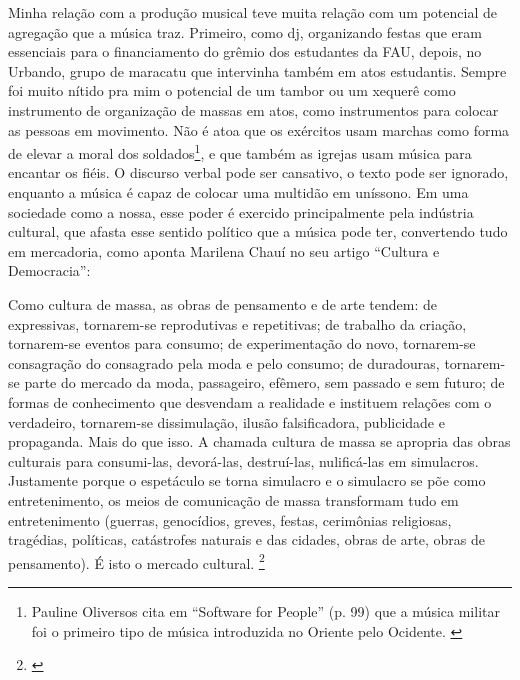 Minha relação com a produção musical teve muita relação com um potencial de agregação que a música traz. Primeiro, como dj, organizando festas que eram essenciais para o financiamento do grêmio dos estudantes da FAU, depois, no Urbando, grupo de maracatu que intervinha também em atos estudantis. Sempre foi muito nítido pra mim o potencial de um tambor ou um xequerê como instrumento de organização de massas em atos, como instrumentos para colocar as pessoas em movimento. Não é atoa que os exércitos usam marchas como forma de elevar a moral dos soldados\footnote{Pauline Oliversos cita em ``Software for People'' (p. 99) que a música militar foi o primeiro tipo de música introduzida no Oriente pelo Ocidente. \cite{Oliveros2012}}, e que também as igrejas usam música para encantar os fiéis. O discurso verbal pode ser cansativo, o texto pode ser ignorado, enquanto a música é capaz de colocar uma multidão em uníssono. Em uma sociedade como a nossa, esse poder é exercido principalmente pela indústria cultural, que afasta esse sentido político que a música pode ter, convertendo tudo em mercadoria, como aponta Marilena Chauí no seu artigo ``Cultura e Democracia'': 

\begin{citacao}

Como cultura de massa, as obras de pensamento e de arte tendem: de expressivas, tornarem-se reprodutivas e repetitivas; de trabalho da criação, tornarem-se eventos para consumo; de experimentação do novo, tornarem-se consagração do consagrado pela moda e pelo consumo; de duradouras, tornarem-se parte do mercado da moda, passageiro, efêmero, sem passado e sem futuro; de formas de conhecimento que desvendam a realidade e instituem relações com o verdadeiro, tornarem-se dissimulação, ilusão falsificadora, publicidade e propaganda. Mais do que isso. A chamada cultura de massa se apropria das obras culturais para consumi-las, devorá-las, destruí-las, nulificá-las em simulacros. Justamente porque o espetáculo se torna simulacro e o simulacro se põe como entretenimento, os meios de comunicação de massa transformam tudo em entretenimento (guerras, genocídios, greves, festas, cerimônias religiosas, tragédias, políticas, catástrofes naturais e das cidades, obras de arte, obras de pensamento). É isto o mercado cultural. \footnote{\cite[61]{MarilenaChaui2008}}
\end{citacao}

